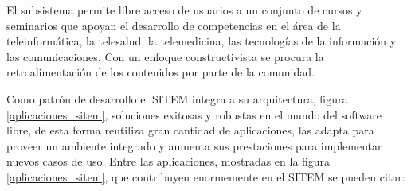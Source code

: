 El subsistema permite libre acceso de usuarios a un conjunto de cursos y seminarios que apoyan el desarrollo de competencias en el área de la teleinformática, la telesalud, la telemedicina, las tecnologías de la información y las comunicaciones. Con un enfoque constructivista se procura la retroalimentación de los contenidos por parte de la comunidad. 

Como patrón de desarrollo el SITEM integra a su arquitectura, figura \ref{aplicaciones_sitem}, soluciones exitosas y robustas en el mundo del software libre, de esta forma reutiliza gran cantidad de aplicaciones, las adapta para proveer un ambiente integrado y aumenta sus prestaciones para implementar nuevos casos de uso. Entre las aplicaciones, mostradas en la figura \ref{aplicaciones_sitem}, que contribuyen enormemente en el SITEM se pueden citar:

